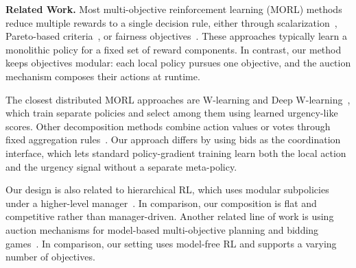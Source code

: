\textbf{Related Work.} Most multi-objective reinforcement learning (MORL) methods reduce multiple rewards to a single decision rule, either through scalarization~\citep{gass1955computational,van2013scalarized}, Pareto-based criteria~\citep{van2014multi,pirotta2015multi}, or fairness objectives~\citep{park2024max,byeon2025multi,siddique2020learning}. These approaches typically learn a monolithic policy for a fixed set of reward components. In contrast, our method keeps objectives modular: each local policy pursues one objective, and the auction mechanism composes their actions at runtime.

The closest distributed MORL approaches are W-learning and Deep W-learning~\citep{humphrys1995w,rosero2024multi}, which train separate policies and select among them using learned urgency-like scores. Other decomposition methods combine action values or votes through fixed aggregation rules~\citep{russell2003q,mendez2019multi}. Our approach differs by using bids as the coordination interface, which lets standard policy-gradient training learn both the local action and the urgency signal without a separate meta-policy.

Our design is also related to hierarchical RL, which uses modular subpolicies under a higher-level manager~\citep{klissarov2025discovering}.
In comparison, our composition is flat and competitive rather than manager-driven.
Another related line of work is using auction mechanisms for model-based multi-objective planning and bidding games~\citep{avni2024auction,lazarus1999combinatorial,avni2019infinite,avni2025bidding}.
In comparison, our setting uses model-free RL and supports a varying number of objectives.
